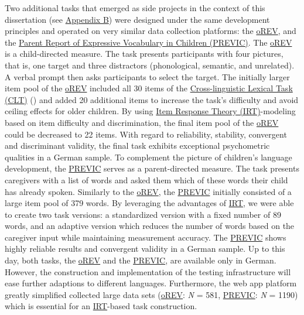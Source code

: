 \documentclass[
]{scrbook}
\begin{document}
Two additional tasks that emerged as side projects in the context of this dissertation (see \hyperref[appendixB]{Appendix B}) were designed under the same development principles and operated on very similar data collection platforms: the \hyperref[acronyms_oREV]{oREV}, and the \hyperref[acronyms_PREVIC]{Parent Report of Expressive Vocabulary in Children (PREVIC)}. The \hyperref[acronyms_oREV]{oREV} is a child-directed measure. The task presents participants with four pictures, that is, one target and three distractors (phonological, semantic, and unrelated). A verbal prompt then asks participants to select the target. The initially larger item pool of the \hyperref[acronyms_oREV]{oREV} included all 30 items of the \hyperref[acronyms_CLT]{Cross-linguistic Lexical Task (CLT)} () and added 20 additional items to increase the task's difficulty and avoid ceiling effects for older children. By using \hyperref[acronyms_IRT]{Item Response Theory (IRT)}-modeling based on item difficulty and discrimination, the final item pool of the \hyperref[acronyms_oREV]{oREV} could be decreased to 22 items. With regard to reliability, stability, convergent and discriminant validity, the final task exhibits exceptional psychometric qualities in a German sample. To complement the picture of children's language development, the \hyperref[acronyms_PREVIC]{PREVIC} serves as a parent-directed measure. The task presents caregivers with a list of words and asked them which of these words their child has already spoken. Similarly to the \hyperref[acronyms_oREV]{oREV}, the \hyperref[acronyms_PREVIC]{PREVIC} initially consisted of a large item pool of 379 words. By leveraging the advantages of \hyperref[acronyms_IRT]{IRT}, we were able to create two task versions: a standardized version with a fixed number of 89 words, and an adaptive version which reduces the number of words based on the caregiver input while maintaining measurement accuracy. The \hyperref[acronyms_PREVIC]{PREVIC} shows highly reliable results and convergent validity in a German sample. Up to this day, both tasks, the \hyperref[acronyms_oREV]{oREV} and the \hyperref[acronyms_PREVIC]{PREVIC}, are available only in German. However, the construction and implementation of the testing infrastructure will ease further adaptions to different languages. Furthermore, the web app platform greatly simplified collected large data sets (\hyperref[acronyms_oREV]{oREV}: \emph{N} = 581, \hyperref[acronyms_PREVIC]{PREVIC}: \emph{N} = 1190) which is essential for an \hyperref[acronyms_IRT]{IRT}-based task construction.
\end{document}
